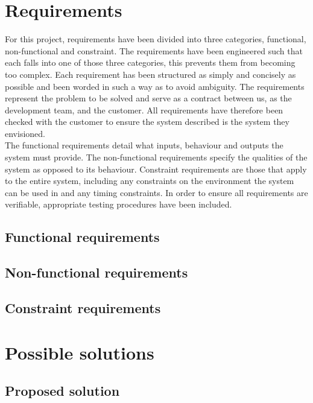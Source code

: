 \documentclass[10pt,a4paper]{article}
\begin{document}
\section{Requirements}
For this project, requirements have been divided into three categories, functional, non-functional and constraint. The requirements have been engineered such that each falls into one of those three categories, this prevents them from becoming too complex. Each requirement has been structured as simply and concisely as possible and been worded in such a way as to avoid ambiguity. The requirements represent the problem to be solved and serve as a contract between us, as the development team, and the customer. All requirements have therefore been checked with the customer to ensure the system described is the system they envisioned.\\
The functional requirements detail what inputs, behaviour and outputs the system must provide. The non-functional requirements specify the qualities of the system as opposed to its behaviour. Constraint requirements are those that apply to the entire system, including any constraints on the environment the system can be used in and any timing constraints. In order to ensure all requirements are verifiable, appropriate testing procedures have been included.

\subsection{Functional requirements}

\subsection{Non-functional requirements}

\subsection{Constraint requirements}

\section{Possible solutions}

\subsection{Proposed solution}
\end{document}
